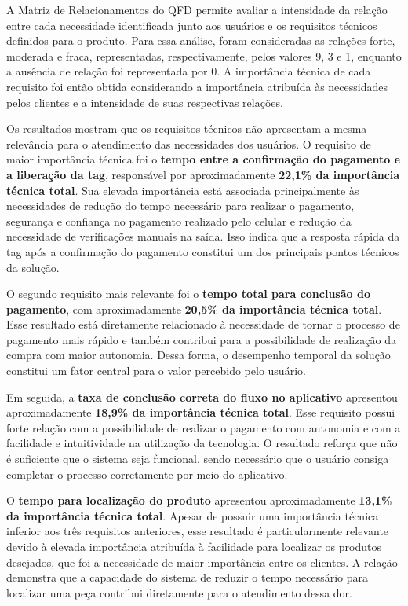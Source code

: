 A Matriz de Relacionamentos do QFD permite avaliar a intensidade da relação entre cada necessidade identificada junto aos usuários e os requisitos técnicos definidos para o produto. Para essa análise, foram consideradas as relações forte, moderada e fraca, representadas, respectivamente, pelos valores 9, 3 e 1, enquanto a ausência de relação foi representada por 0. A importância técnica de cada requisito foi então obtida considerando a importância atribuída às necessidades pelos clientes e a intensidade de suas respectivas relações.

Os resultados mostram que os requisitos técnicos não apresentam a mesma relevância para o atendimento das necessidades dos usuários. O requisito de maior importância técnica foi o \textbf{tempo entre a confirmação do pagamento e a liberação da tag}, responsável por aproximadamente \textbf{22,1\% da importância técnica total}. Sua elevada importância está associada principalmente às necessidades de redução do tempo necessário para realizar o pagamento, segurança e confiança no pagamento realizado pelo celular e redução da necessidade de verificações manuais na saída. Isso indica que a resposta rápida da tag após a confirmação do pagamento constitui um dos principais pontos técnicos da solução.

O segundo requisito mais relevante foi o \textbf{tempo total para conclusão do pagamento}, com aproximadamente \textbf{20,5\% da importância técnica total}. Esse resultado está diretamente relacionado à necessidade de tornar o processo de pagamento mais rápido e também contribui para a possibilidade de realização da compra com maior autonomia. Dessa forma, o desempenho temporal da solução constitui um fator central para o valor percebido pelo usuário.

Em seguida, a \textbf{taxa de conclusão correta do fluxo no aplicativo} apresentou aproximadamente \textbf{18,9\% da importância técnica total}. Esse requisito possui forte relação com a possibilidade de realizar o pagamento com autonomia e com a facilidade e intuitividade na utilização da tecnologia. O resultado reforça que não é suficiente que o sistema seja funcional, sendo necessário que o usuário consiga completar o processo corretamente por meio do aplicativo.

O \textbf{tempo para localização do produto} apresentou aproximadamente \textbf{13,1\% da importância técnica total}. Apesar de possuir uma importância técnica inferior aos três requisitos anteriores, esse resultado é particularmente relevante devido à elevada importância atribuída à facilidade para localizar os produtos desejados, que foi a necessidade de maior importância entre os clientes. A relação demonstra que a capacidade do sistema de reduzir o tempo necessário para localizar uma peça contribui diretamente para o atendimento dessa dor.

